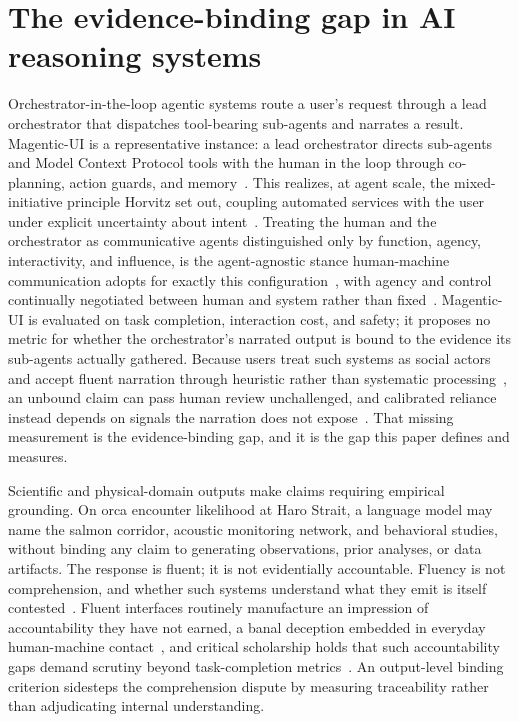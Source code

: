 \section{The evidence-binding gap in AI reasoning systems}

Orchestrator-in-the-loop agentic systems route a user's request through a lead orchestrator that dispatches
tool-bearing sub-agents and narrates a result. Magentic-UI is a
representative instance: a lead orchestrator directs sub-agents and Model Context Protocol tools
with the human in the loop through co-planning, action guards, and memory~\cite{magenticui2025}.
This realizes, at agent scale, the mixed-initiative principle Horvitz set out, coupling
automated services with the user under explicit uncertainty about intent~\cite{horvitz1999}.
Treating the human and the orchestrator as communicative agents distinguished only by function, 
agency, interactivity, and influence, is the agent-agnostic stance human-machine communication
adopts for exactly this configuration~\cite{banks2020agentagnostic,walther2011cmc}, with agency and
control continually negotiated between human and system rather than fixed~\cite{gibbs2021agency}.
Magentic-UI is evaluated on task completion, interaction cost, and safety; it proposes no metric for
whether the orchestrator's narrated output is bound to the evidence its sub-agents actually gathered.
Because users treat such systems as social actors~\cite{gambino2020casa} and accept fluent narration
through heuristic rather than systematic processing~\cite{koban2023dual}, an unbound claim can pass
human review unchallenged, and calibrated reliance instead depends on signals the narration does not
expose~\cite{hoff2015trust}. That missing measurement is the evidence-binding gap, and it is the gap
this paper defines and measures.

Scientific and physical-domain outputs make claims requiring empirical grounding. On orca encounter
likelihood at Haro Strait, a language model may name the salmon corridor, acoustic monitoring
network, and behavioral studies, without binding any claim to generating observations, prior
analyses, or data artifacts. The response is fluent; it is not evidentially accountable. Fluency is not comprehension, and whether such systems understand what
they emit is itself contested~\cite{mitchell2023understanding}. Fluent interfaces routinely
manufacture an impression of accountability they have not earned, a banal deception embedded in
everyday human-machine contact~\cite{natale2021deceitful}, and critical scholarship holds that such
accountability gaps demand scrutiny beyond task-completion metrics~\cite{gardner2024critical}. An
output-level binding criterion sidesteps the comprehension dispute by measuring traceability rather
than adjudicating internal understanding.

